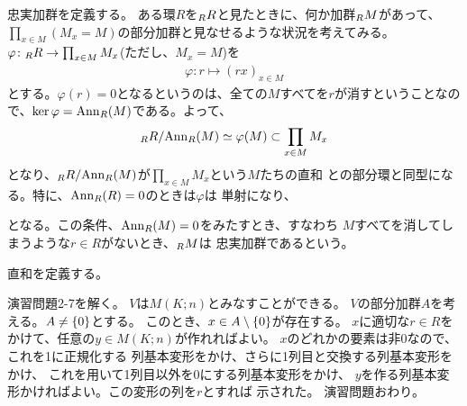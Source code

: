 \documentclass[9pt]{ltjsarticle}
\begin{document}
\begin{enumerate}[label=(\arabic*)]
忠実加群を定義する。
ある環$R$を${}_{R}R$と見たときに、何か加群${}_{R}M$があって、
$\prod_{x\in M} (M_x = M)$の部分加群と見なせるような状況を考えてみる。
$\varphi\colon {}_{R}R \to \prod_{x\in M} M_x$(ただし、$M_x = M$)を
\begin{align}
  \varphi \colon r \mapsto (rx)_{x\in M}
\end{align}
とする。$\varphi(r)=0$となるというのは、全ての$M$すべてを$r$が消すということなので、$\ker \varphi = \mathrm{Ann}_R(M)$である。よって、
\begin{align}
  {}_{R}R/\mathrm{Ann}_R(M) \simeq \varphi(M) \subset \prod_{x\in M}M_x
\end{align}
となり、${}_{R}R/\mathrm{Ann}_R(M)$が$\prod_{x\in M}M_x$という$M$たちの直和
との部分環と同型になる。特に、$\mathrm{Ann}_R(R)=0$のときは$\varphi$は
単射になり、
\begin{center}
\end{center}
となる。この条件、$\mathrm{Ann}_R(M)=0$をみたすとき、すなわち
$M$すべてを消してしまうような$r\in R$がないとき、${}_{R}M$は
忠実加群であるという。
\end{enumerate}

直和を定義する。

演習問題2-7を解く。
$V$は$M(K;n)$とみなすことができる。
$V$の部分加群$A$を考える。$A\neq \{0\}$とする。
このとき、$x\in A\setminus\{0\}$が存在する。
$x$に適切な$r\in R$をかけて、任意の$y \in M(K;n)$が作れればよい。
$x$のどれかの要素は非0なので、これを1に正規化する
列基本変形をかけ、さらに1列目と交換する列基本変形をかけ、
これを用いて1列目以外を0にする列基本変形をかけ、
$y$を作る列基本変形かければよい。この変形の列を$r$とすれば
示された。
演習問題おわり。
\end{document}
